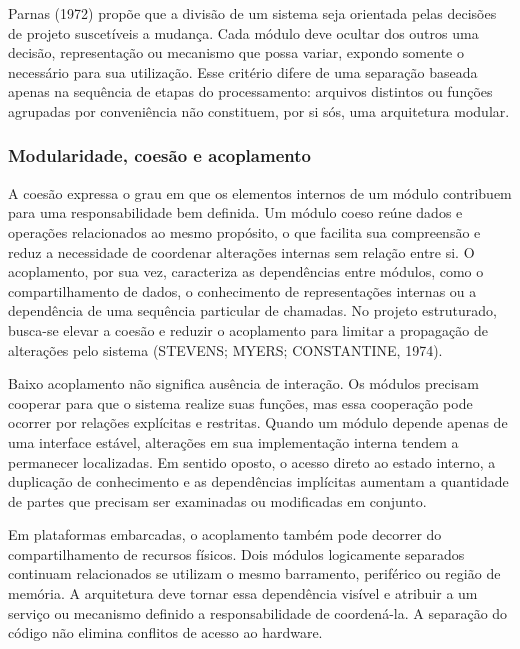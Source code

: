 \documentclass[a4paper,12pt]{article}
\begin{document}
Parnas (1972) prop\~oe que a divis\~ao de um sistema seja orientada pelas decis\~oes de projeto suscet\'iveis a mudan\c{c}a. Cada m\'odulo deve ocultar dos outros uma decis\~ao, representa\c{c}\~ao ou mecanismo que possa variar, expondo somente o necess\'ario para sua utiliza\c{c}\~ao. Esse crit\'erio difere de uma separa\c{c}\~ao baseada apenas na sequ\^encia de etapas do processamento: arquivos distintos ou fun\c{c}\~oes agrupadas por conveni\^encia n\~ao constituem, por si s\'os, uma arquitetura modular.


\subsubsection{Modularidade, coes\~ao e acoplamento}


A coes\~ao expressa o grau em que os elementos internos de um m\'odulo contribuem para uma responsabilidade bem definida. Um m\'odulo coeso re\'une dados e opera\c{c}\~oes relacionados ao mesmo prop\'osito, o que facilita sua compreens\~ao e reduz a necessidade de coordenar altera\c{c}\~oes internas sem rela\c{c}\~ao entre si. O acoplamento, por sua vez, caracteriza as depend\^encias entre m\'odulos, como o compartilhamento de dados, o conhecimento de representa\c{c}\~oes internas ou a depend\^encia de uma sequ\^encia particular de chamadas. No projeto estruturado, busca-se elevar a coes\~ao e reduzir o acoplamento para limitar a propaga\c{c}\~ao de altera\c{c}\~oes pelo sistema (STEVENS; MYERS; CONSTANTINE, 1974).


Baixo acoplamento n\~ao significa aus\^encia de intera\c{c}\~ao. Os m\'odulos precisam cooperar para que o sistema realize suas fun\c{c}\~oes, mas essa coopera\c{c}\~ao pode ocorrer por rela\c{c}\~oes expl\'icitas e restritas. Quando um m\'odulo depende apenas de uma interface est\'avel, altera\c{c}\~oes em sua implementa\c{c}\~ao interna tendem a permanecer localizadas. Em sentido oposto, o acesso direto ao estado interno, a duplica\c{c}\~ao de conhecimento e as depend\^encias impl\'icitas aumentam a quantidade de partes que precisam ser examinadas ou modificadas em conjunto.


Em plataformas embarcadas, o acoplamento tamb\'em pode decorrer do compartilhamento de recursos f\'isicos. Dois m\'odulos logicamente separados continuam relacionados se utilizam o mesmo barramento, perif\'erico ou regi\~ao de mem\'oria. A arquitetura deve tornar essa depend\^encia vis\'ivel e atribuir a um servi\c{c}o ou mecanismo definido a responsabilidade de coorden\'a-la. A separa\c{c}\~ao do c\'odigo n\~ao elimina conflitos de acesso ao hardware.
\end{document}
